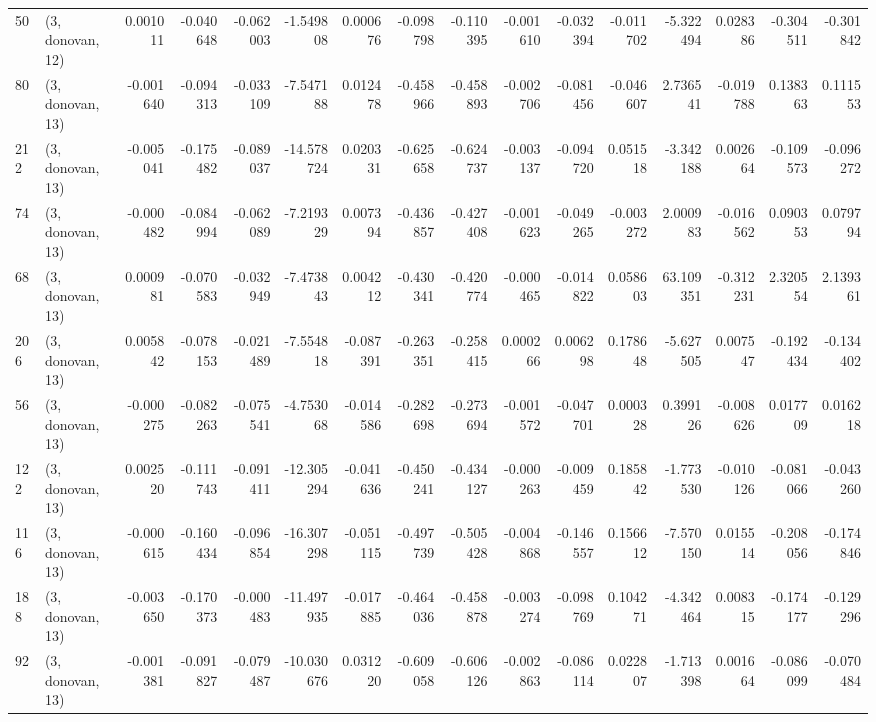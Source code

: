 \begin{tabular}{llrrrrrrrrrrrrrr}
50  &  (3, donovan, 12) &   0.001011 & -0.040648 & -0.062003 &   -1.549808 &  0.000676 &  -0.098798 & -0.110395 & -0.001610 & -0.032394 & -0.011702 &   -5.322494 &  0.028386 & -0.304511 & -0.301842 \\
80  &  (3, donovan, 13) &  -0.001640 & -0.094313 & -0.033109 &   -7.547188 &  0.012478 &  -0.458966 & -0.458893 & -0.002706 & -0.081456 & -0.046607 &    2.736541 & -0.019788 &  0.138363 &  0.111553 \\
212 &  (3, donovan, 13) &  -0.005041 & -0.175482 & -0.089037 &  -14.578724 &  0.020331 &  -0.625658 & -0.624737 & -0.003137 & -0.094720 &  0.051518 &   -3.342188 &  0.002664 & -0.109573 & -0.096272 \\
74  &  (3, donovan, 13) &  -0.000482 & -0.084994 & -0.062089 &   -7.219329 &  0.007394 &  -0.436857 & -0.427408 & -0.001623 & -0.049265 & -0.003272 &    2.000983 & -0.016562 &  0.090353 &  0.079794 \\
68  &  (3, donovan, 13) &   0.000981 & -0.070583 & -0.032949 &   -7.473843 &  0.004212 &  -0.430341 & -0.420774 & -0.000465 & -0.014822 &  0.058603 &   63.109351 & -0.312231 &  2.320554 &  2.139361 \\
206 &  (3, donovan, 13) &   0.005842 & -0.078153 & -0.021489 &   -7.554818 & -0.087391 &  -0.263351 & -0.258415 &  0.000266 &  0.006298 &  0.178648 &   -5.627505 &  0.007547 & -0.192434 & -0.134402 \\
56  &  (3, donovan, 13) &  -0.000275 & -0.082263 & -0.075541 &   -4.753068 & -0.014586 &  -0.282698 & -0.273694 & -0.001572 & -0.047701 &  0.000328 &    0.399126 & -0.008626 &  0.017709 &  0.016218 \\
122 &  (3, donovan, 13) &   0.002520 & -0.111743 & -0.091411 &  -12.305294 & -0.041636 &  -0.450241 & -0.434127 & -0.000263 & -0.009459 &  0.185842 &   -1.773530 & -0.010126 & -0.081066 & -0.043260 \\
116 &  (3, donovan, 13) &  -0.000615 & -0.160434 & -0.096854 &  -16.307298 & -0.051115 &  -0.497739 & -0.505428 & -0.004868 & -0.146557 &  0.156612 &   -7.570150 &  0.015514 & -0.208056 & -0.174846 \\
188 &  (3, donovan, 13) &  -0.003650 & -0.170373 & -0.000483 &  -11.497935 & -0.017885 &  -0.464036 & -0.458878 & -0.003274 & -0.098769 &  0.104271 &   -4.342464 &  0.008315 & -0.174177 & -0.129296 \\
92  &  (3, donovan, 13) &  -0.001381 & -0.091827 & -0.079487 &  -10.030676 &  0.031220 &  -0.609058 & -0.606126 & -0.002863 & -0.086114 &  0.022807 &   -1.713398 &  0.001664 & -0.086099 & -0.070484 \\

\end{tabular}
